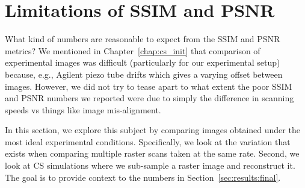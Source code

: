 \section{Limitations of SSIM and PSNR}\label{sec:psnr_ssim_limits}
What kind of numbers are reasonable to expect from the SSIM and PSNR metrics?
We mentioned in Chapter~\ref{chap:cs_init} that comparison of experimental images was difficult (particularly for our experimental setup) because, e.g., Agilent piezo tube drifts which gives a varying offset between images. However, we did not try to tease apart to what extent the poor SSIM and PSNR numbers we reported were due to simply the difference in scanning speeds vs things like image mis-alignment.

In this section, we explore this subject by comparing images obtained under the most ideal experimental conditions. Specifically, we look at the variation that exists when comparing multiple raster scans taken at the same rate. Second, we look at CS simulations where we sub-sample a raster image and reconstruct it. The goal is to provide context to the numbers in Section~\ref{sec:results:final}.

